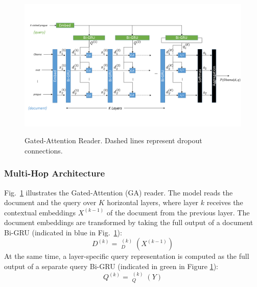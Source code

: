 \documentclass[11pt,a4paper]{article}
\DeclareMathOperator{\bigru}{\overset{\longleftrightarrow}{\mathrm{GRU}}}
\begin{document}

\begin{figure}[t]
\centering
\caption{Gated-Attention Reader. Dashed lines represent dropout connections.}
\includegraphics[width=\linewidth,trim={0 25mm 0 25mm},clip]{ga_reader.png}
\label{fig:model}
\end{figure}

\subsubsection{Multi-Hop Architecture}
Fig.\ \ref{fig:model} illustrates the Gated-Attention (GA) reader. 
The model reads the document and the query over $K$ horizontal layers,
where layer $k$ receives the contextual embeddings $X^{(k-1)}$ of the document from the previous layer. The document embeddings are transformed by taking the full output of a document Bi-GRU (indicated in blue in Fig.\ \ref{fig:model}):
\begin{equation}
    D^{(k)} = \bigru^{(k)}_D(X^{(k-1)})
\end{equation}
At the same time, a layer-specific query representation is computed as the full output of a separate query Bi-GRU (indicated in green in Figure \ref{fig:model}):
\begin{equation}
    Q^{(k)} = \bigru^{(k)}_Q(Y)
\end{equation}
\end{document}
